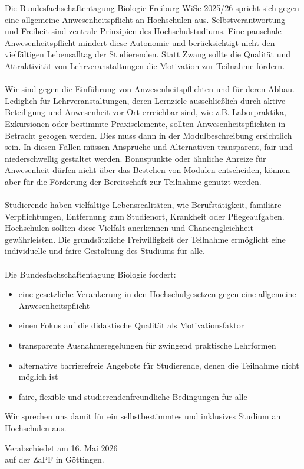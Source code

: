 \documentclass[DIV=calc]{scrartcl}
\begin{document}
Die Bundesfachschaftentagung Biologie Freiburg WiSe 2025/26 spricht sich gegen eine
allgemeine Anwesenheitspflicht an Hochschulen aus. Selbstverantwortung und Freiheit
sind zentrale Prinzipien des Hochschulstudiums. Eine pauschale Anwesenheitspflicht
mindert diese Autonomie und berücksichtigt nicht den vielfältigen Lebensalltag der
Studierenden. Statt Zwang sollte die Qualität und Attraktivität von Lehrveranstaltungen die
Motivation zur Teilnahme fördern. \\\\
Wir sind gegen die Einführung von Anwesenheitspflichten und für deren Abbau. Lediglich
für Lehrveranstaltungen, deren Lernziele ausschließlich durch aktive Beteiligung und
Anwesenheit vor Ort erreichbar sind, wie z.B. Laborpraktika, Exkursionen oder bestimmte
Praxiselemente, sollten Anwesenheitspflichten in Betracht gezogen werden. Dies muss
dann in der Modulbeschreibung ersichtlich sein. In diesen Fällen müssen Ansprüche und
Alternativen transparent, fair und niederschwellig gestaltet werden. Bonuspunkte oder
ähnliche Anreize für Anwesenheit dürfen nicht über das Bestehen von Modulen
entscheiden, können aber für die Förderung der Bereitschaft zur Teilnahme genutzt
werden.\\\\
Studierende haben vielfältige Lebensrealitäten, wie Berufstätigkeit, familiäre
Verpflichtungen, Entfernung zum Studienort, Krankheit oder Pflegeaufgaben. Hochschulen
sollten diese Vielfalt anerkennen und Chancengleichheit gewährleisten. Die grundsätzliche
Freiwilligkeit der Teilnahme ermöglicht eine individuelle und faire Gestaltung des Studiums
für alle.\\\\
Die Bundesfachschaftentagung Biologie fordert:
\begin{itemize}
    \item eine gesetzliche Verankerung in den Hochschulgesetzen gegen eine allgemeine Anwesenheitspflicht
    \item einen Fokus auf die didaktische Qualität als Motivationsfaktor
    \item transparente Ausnahmeregelungen für zwingend praktische Lehrformen
    \item alternative barrierefreie Angebote für Studierende, denen die Teilnahme nicht möglich ist
    \item faire, flexible und studierendenfreundliche Bedingungen für alle
\end{itemize}
Wir sprechen uns damit für ein selbstbestimmtes und inklusives Studium an Hochschulen
aus.

\vspace{1cm} 
%
\vfill
\begin{flushright}
	Verabschiedet am 16. Mai 2026 \\
	auf der ZaPF in Göttingen.
\end{flushright}
\end{document}
